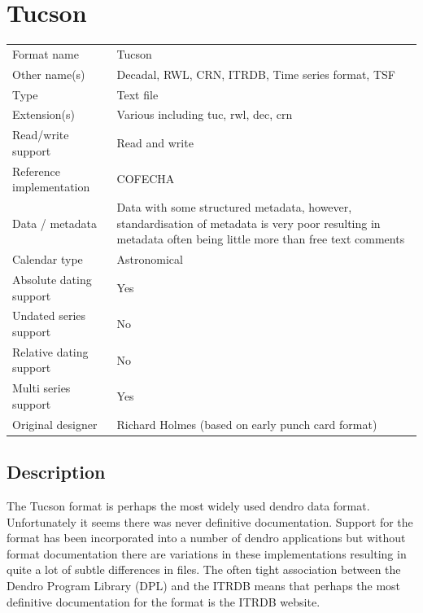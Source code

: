 \chapter{Tucson}
\begin{table}[htbp]
\label{summary:tucson}
\begin{center}
\begin{tabular*}{15cm}{ l @{\extracolsep{\fill}} p{9cm} }
  \toprule

Format name     	 & Tucson\\
Other name(s)      	 & Decadal, RWL, CRN, ITRDB, Time series format, TSF\\
Type      	 	 & Text file\\
Extension(s)      	 & Various including tuc, rwl, dec, crn\\
Read/write support     	 & Read and write\\
Reference implementation & COFECHA\\
Data / metadata      	 & Data with some structured metadata, however, standardisation of metadata is very poor resulting in metadata often being little more than free text comments\\
Calendar type		 & Astronomical\\
Absolute dating support	 & Yes\\
Undated series support   & No\\
Relative dating support  & No\\
Multi series support	 & Yes\\
Original designer	 & Richard Holmes (based on early punch card format)\\

\bottomrule
\end{tabular*}
\end{center}
\end{table}

\section{Description}
The Tucson format is perhaps the most widely used dendro data format. Unfortunately it seems there was never definitive documentation. Support for the format has been incorporated into a number of dendro applications but without format documentation there are variations in these implementations resulting in quite a lot of subtle differences in files. The often tight association between the Dendro Program Library (DPL) and the ITRDB means that perhaps the most definitive documentation for the format is the ITRDB website.

